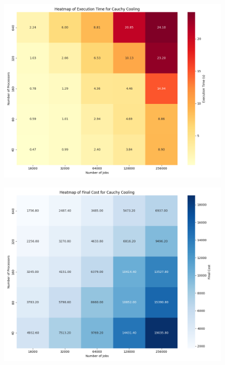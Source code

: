 \documentclass[openany, twoside, a4paper, 12pt]{extbook}
\begin{document}
\begin{figure}[ht]
    \centering
    \begin{minipage}{0.49\textwidth}
        \centering
        \includegraphics[width=\textwidth]{cauchy_cooling_heatmap_execution_time.png}
        \label{fig:image3}
    \end{minipage}
    \hfill
    \begin{minipage}{0.49\textwidth}
        \centering
        \includegraphics[width=\textwidth]{cauchy_cooling_heatmap_final_cost.png}
        \label{fig:image4}
    \end{minipage}
    \vspace{-50pt} %
\end{figure}
\end{document}
